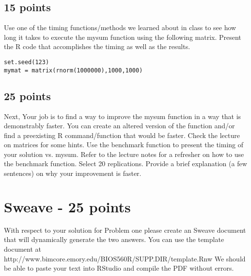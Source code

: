 \documentclass{article}
\begin{document}
\subsection{15 points}Use one of the timing functions/methods we learned about in class to see how long it takes to execute the mysum function using the following matrix. Present the R code that accomplishes the timing as well as the results.
\begin{verbatim}
set.seed(123)
mymat = matrix(rnorm(1000000),1000,1000)
\end{verbatim}

\subsection{25 points}Next, Your job is to find a way to improve the mysum function in a way that is demonstrably faster. You can create an altered version of the function and/or find a preexisting R command/function that would be faster. Check the lecture on matrices for some hints. Use the benchmark function to present the timing of your solution vs. mysum. Refer to the lecture notes for a refresher on how to use the benchmark function. Select 20 replications. Provide a brief explanation (a few sentences) on why your improvement is faster. 

\section{Sweave - 25 points}
With respect to your solution for Problem one please create an Sweave document that will dynamically generate the two answers. You can use the template document at http://www.bimcore.emory.edu/BIOS560R/SUPP.DIR/template.Rnw  We should be able to paste your text into RStudio and compile the PDF without errors. 
\end{document}
